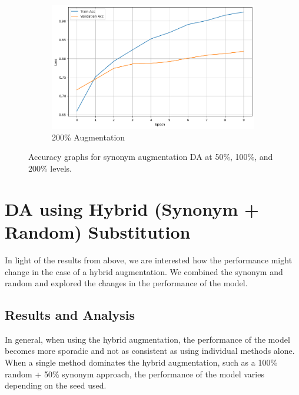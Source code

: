 \documentclass{article}
\begin{document}
\begin{figure}[ht]
\begin{subfigure}[b]{0.3\textwidth}
    \includegraphics[width=\textwidth]{img/synonym_100.png}
    \caption{200\% Augmentation}
    \label{fig:synonym_100}
  \end{subfigure}
  \caption{Accuracy graphs for synonym augmentation DA at 50\%, 100\%, and 200\% levels.}
  \label{fig:synonym_extreme_substitution_acc}
\end{figure}

\section{DA using Hybrid (Synonym + Random) Substitution}

In light of the results from above, we are interested how the performance might
change in the case of a hybrid augmentation. We combined the synonym and random
and explored the changes in the performance of the model.

\subsection{Results and Analysis}

In general, when using the hybrid augmentation, the performance of the model
becomes more sporadic and not as consistent as using individual methods alone.
When a single method dominates the hybrid augmentation, such as a 100\% random
+ 50\% synonym approach, the performance of the model varies depending on the
seed used.
\end{document}

